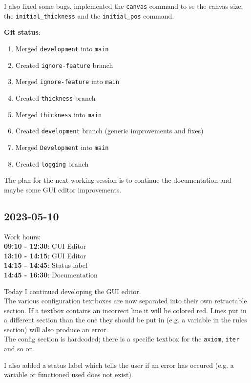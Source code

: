 \documentclass{article}
\begin{document}
I also fixed some bugs, implemented the \texttt{canvas} command
to se the canvas size, the \texttt{initial\_thickness}
and the \texttt{initial\_pos} command.

\textbf{Git status}:
\begin{enumerate}
    \item Merged \texttt{development} into \texttt{main}
    \item Created \texttt{ignore-feature} branch
    \item Merged \texttt{ignore-feature} into \texttt{main}
    \item Created \texttt{thickness} branch
    \item Merged \texttt{thickness} into \texttt{main}
    \item Created \texttt{development} branch (generic improvements and fixes)
    \item Merged \texttt{Development} into \texttt{main}
    \item Created \texttt{logging} branch
\end{enumerate}

The plan for the next working session is to continue the documentation and maybe
some GUI editor improvements.

\subsection{2023-05-10}

Work hours:\\
\textbf{09:10 - 12:30}: GUI Editor \\
\textbf{13:10 - 14:15}: GUI Editor \\
\textbf{14:15 - 14:45}: Status label \\
\textbf{14:45 - 16:30}: Documentation

Today I continued developing the GUI editor.
\\
The various configuration textboxes are now separated into their own
retractable section. If a textbox contains an incorrect line
it will be colored red. Lines put in a different section than the one
they should be put in (e.g. a variable in the rules section)
will also produce an error. \\
The config section is hardcoded; there is a specific textbox
for the \texttt{axiom}, \texttt{iter} and so on.

I also added a status label which tells the user if an error has occured
(e.g. a variable or functioned used does not exist).
\end{document}
